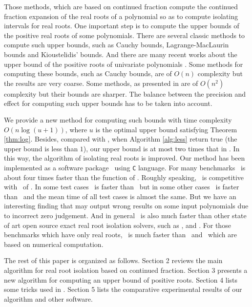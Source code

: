 Those methods, which are  based on  continued fraction compute the continued fraction expansion of the real roots of a polynomial so as to  compute isolating intervals for real roots. One important step
is to  compute the upper bounds of the positive real roots of some polynomials. There are  several classic methods to compute such upper bounds, such as Cauchy bounds, Lagrange-MacLaurin  bounds and Kioustelidis' bounds. And there are many recent works about the upper bound of the positive roots of univariate polynomials \cite{hong98,ste05,akr08}. Some methods for computing these bounds,  such as Cauchy bounds, are of $O(n)$ complexity but the results are very coarse. Some methods, as presented in  \cite{akr08} are of $O(n^2)$ complexity but their bounds are sharper. The balance between the precision and effect for computing such upper bounds has to be taken into account.

We provide a new method for computing such bounds with time complexity $O(n\log(u+1))$, where $u$ is the optimal upper bound satisfying Theorem \ref{thm:log}. Besides, compared
with \cite{akr08}, when  Algorithm \ref{alg:less} return true (the upper bound is less than $1$), our upper bound is at most two times that in \cite{akr08}. In this way, the algorithm of   isolating real roots is improved.  Our  method has been implemented as a  software package \froot\ using \texttt{C} language. For many benchmarks \froot \  is about four  times
faster   than  the function {\tt \REALROOT} of \MAPLE. Roughly speaking, \froot\ is competitive with \inte\ of \MM. In some test cases \froot\ is faster than \inte\ but in some other cases \inte\ is faster than \froot\ and the mean time of all test cases is almost the same. But we have an interesting finding that {\tt \inte} may output wrong results on some input polynomials due to incorrect zero judgement. %
And in general \froot\ is also much faster than other state of art
open source exact real root isolation solvers, such as \cf, \AND and \SLV. For those  benchmarks which  have only real roots, \froot\ is much faster than \sle\ and \eign\ which are based on numerical computation.


The rest of this paper is organized as follows. Section 2 reviews the
main algorithm for real root isolation based on  continued fraction. Section 3 presents a new algorithm for
computing an upper bound of positive roots. Section 4 lists some tricks used in \froot.  Section 5 lists the comparative experimental results of our algorithm and other software. %
